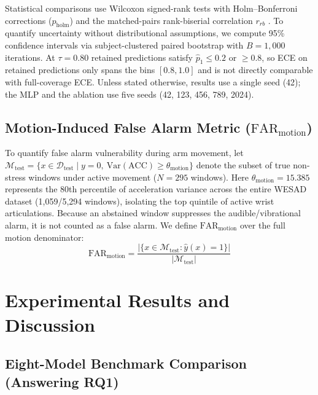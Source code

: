 \documentclass[conference]{IEEEtran}
\begin{document}
Statistical comparisons use Wilcoxon signed-rank tests \cite{wilcoxon1945individual} with Holm--Bonferroni corrections \cite{holm1979simple, demsar2006statistical} ($p_{\text{holm}}$) and the matched-pairs rank-biserial correlation $r_{rb}$ \cite{kerby2014simple}. To quantify uncertainty without distributional assumptions, we compute 95\% confidence intervals via subject-clustered paired bootstrap \cite{efron1993bootstrap} with $B=1,000$ iterations. At $\tau=0.80$ retained predictions satisfy $\hat p_1\le 0.2$ or $\ge 0.8$, so ECE on retained predictions only spans the bins $[0.8,1.0]$ and is not directly comparable with full-coverage ECE. Unless stated otherwise, results use a single seed (42); the MLP and the ablation use five seeds (42, 123, 456, 789, 2024).

\subsection{Motion-Induced False Alarm Metric ($\text{FAR}_{\text{motion}}$)}
To quantify false alarm vulnerability during arm movement, let $\mathcal{M}_{\text{test}} = \{x \in \mathcal{D}_{\text{test}} \mid y=0, \ \text{Var}(\text{ACC}) \ge \theta_{\text{motion}}\}$ denote the subset of true non-stress windows under active movement ($N=295$ windows). Here $\theta_{\text{motion}} = 15.385$ represents the 80th percentile of acceleration variance across the entire WESAD dataset (1,059/5,294 windows), isolating the top quintile of active wrist articulations. Because an abstained window suppresses the audible/vibrational alarm, it is not counted as a false alarm. We define $\text{FAR}_{\text{motion}}$ over the full motion denominator:
\begin{equation}
\text{FAR}_{\text{motion}} = \frac{|\{x \in \mathcal{M}_{\text{test}} : \hat{y}(x) = 1\}|}{|\mathcal{M}_{\text{test}}|}
\end{equation}

\section{Experimental Results and Discussion}

\subsection{Eight-Model Benchmark Comparison (Answering RQ1)}
\end{document}
